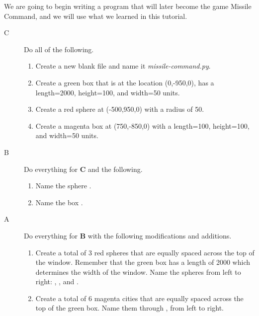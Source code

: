 \analysis

We are going to begin writing a program that will later become the game Missile Command, and we will use what we learned in this tutorial.

\begin{description}

\item[C] Do all of the following.
\begin{enumerate}
	\item Create a new blank file and name it \emph{missile-command.py}. 
	\item Create a green box that is at the location (0,-950,0), has a length=2000, height=100, and width=50 units.
	\item Create a red sphere at (-500,950,0) with a radius of 50.
	\item Create a magenta box at (750,-850,0) with a length=100, height=100, and width=50 units.
\end{enumerate}

\item[B] Do everything for {\bf C} and the following.

\begin{enumerate}
	\item Name the sphere .
	\item Name the box .
\end{enumerate}

\item[A] Do everything for {\bf B} with the following modifications and additions.

\begin{enumerate}
	\item Create a total of 3 red spheres that are equally spaced across the top of the window. Remember that the green box has a length of 2000 which determines the width of the window. Name the spheres from left to right: , , and .
	\item Create a total of 6 magenta cities that are equally spaced across the top of the green box. Name them  through , from left to right.
\end{enumerate}




\end{description}

